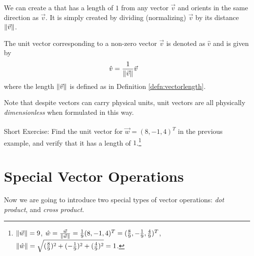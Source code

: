 We can create a  that has a length of $1$ from any vector $\vec{v}$ and orients in the same direction as $\vec{v}$. It is simply created by dividing (normalizing) $\vec{v}$ by its distance $\norm{\vec{v}}$.
\begin{defn}
\label{defn:unitvec}
The unit vector corresponding to a non-zero vector $\vec{v}$ is denoted as $\hat{v}$ and is given by
\begin{align*}
\hat{v} &= \frac{1}{\norm{\vec{v}}}\vec{v}
\end{align*}
where the length $\norm{\vec{v}}$ is defined as in Definition \ref{defn:vectorlength}. 
\end{defn}
Note that despite vectors can carry physical units, unit vectors are all physically \textit{dimensionless} when formulated in this way. \\
\\
Short Exercise: Find the unit vector for $\vec{w} = (8, -1, 4)^T$ in the previous example, and verify that it has a length of $1$.\footnote{$\norm{\vec{w}} = 9$, $\hat{w} = \frac{\vec{w}}{\norm{\vec{w}}} = \frac{1}{9}(8,-1,4)^T = (\frac{8}{9}, -\frac{1}{9}, \frac{4}{9})^T$, $\norm{\hat{w}} = \sqrt{(\frac{8}{9})^2 + (-\frac{1}{9})^2 + (\frac{4}{9})^2} = 1$.}

\section{Special Vector Operations}
\label{section:vectorops}
Now we are going to introduce two special types of vector operations: \textit{dot product}, and \textit{cross product}. 

